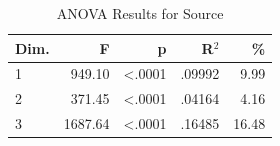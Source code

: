 \begin{table}[H]
  \centering
  \caption{ANOVA Results for Source}
  \label{tab:anova_source}
  \begin{tabular}{l r r r r}
    Dim. & F & p & R$^2$ & \% \\
    \hline
    1 & 949.10 & <.0001 & .09992 & 9.99 \\
    2 & 371.45 & <.0001 & .04164 & 4.16 \\
    3 & 1687.64 & <.0001 & .16485 & 16.48 \\
  \end{tabular}
\end{table}
